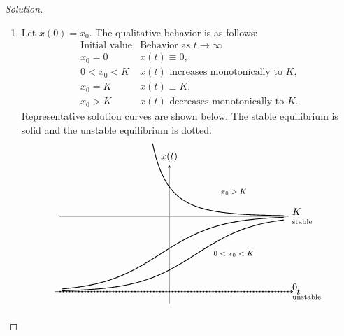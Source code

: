 \documentclass[10pt]{amsart}
\newenvironment{solution}
{\begin{proof}[Solution]}
{\end{proof}}
\begin{document}
\begin{onehalfspace}
\begin{solution}
\begin{enumerate}[label=\alph*)]
                \item Let $x(0)=x_0$. The qualitative behavior is as follows:
                \[
                    \begin{array}{c|c}
                        \text{Initial value}&\text{Behavior as }t\to\infty\\ \hline
                        x_0=0&x(t)\equiv0,\\
                        0<x_0<K&x(t)\text{ increases monotonically to }K,\\
                        x_0=K&x(t)\equiv K,\\
                        x_0>K&x(t)\text{ decreases monotonically to }K.
                    \end{array}
                \]
                Representative solution curves are shown below. The stable equilibrium is
                solid and the unstable equilibrium is dotted.
                \[
                    \begin{tikzpicture}[>=stealth,x=0.86cm,y=0.88cm]
                  \draw[->] (-4.8,0)--(5.2,0) node[right] {$t$};
                  \draw[->] (0,-0.5)--(0,5.2) node[above] {$x(t)$};

                  \draw[very thick,dotted] (-4.6,0)--(5.0,0)
                  node[right,align=left] {$0$\\[-1mm]{\scriptsize unstable}};
                  \draw[thick] (-4.6,3.1)--(5.0,3.1)
                  node[right,align=left] {$K$\\[-1mm]{\scriptsize stable}};

                  \draw[thick,domain=-4.5:4.8,samples=120,smooth]
                  plot (\x,{3.1/(1+2.5*exp(-0.8*\x))});
                  \draw[thick,domain=-4.5:4.8,samples=120,smooth]
                  plot (\x,{3.1/(1+0.75*exp(-0.8*\x))});

                  \draw[thick,domain=-0.7:4.8,samples=120,smooth]
                  plot (\x,{3.1/(1-0.28*exp(-0.8*\x))});
                  \node at (2.7,4.1) {\scriptsize $x_0>K$};
                  \node at (2.7,1.55) {\scriptsize $0<x_0<K$};
                    \end{tikzpicture}
                \]


\end{enumerate}
\end{solution}
\end{onehalfspace}
\end{document}
